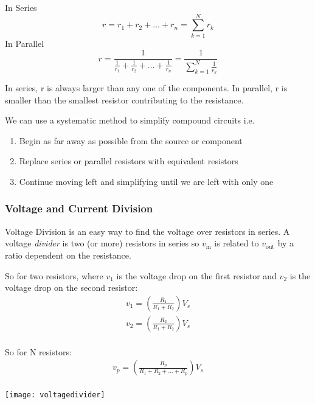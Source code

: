 \documentclass[12pt]{article}
\begin{document}
In Series
\begin{equation*}
  r = r_1 + r_2 + \dots + r_n = \sum^N_{k=1} r_k
\end{equation*}
In Parallel
\begin{equation*}
  r = \frac{1}{\frac{1}{r_1} + \frac{1}{r_2} + \dots + \frac{1}{r_n}} = \frac{1}{\sum^N_{k=1}\frac{1}{r_k}}
\end{equation*}


In series, r is always larger than any one of the components.
In parallel, r is smaller than the smallest resistor contributing to the resistance. 

We can use a systematic method to simplify compound circuits i.e.
\begin{enumerate}
  \item Begin as far away as possible from the source or component
  \item Replace series or parallel resistors with equivalent resistors
  \item Continue moving left and simplifying until we are left with only one
\end{enumerate}

\subsubsection{Voltage and Current Division}
Voltage Division is an easy way to find the voltage over resistors in series.
A voltage \textit{divider} is two (or more) resistors in series so $v_{\text{in}}$ is related to $v_{\text{out}}$ by a ratio dependent on the resistance.

So for two resistors, where $v_1$ is the voltage drop on the first resistor and $v_2$ is the voltage drop on the second resistor:
\begin{align*}
  v_1 = (\frac{R_1}{R_1 + R_2})V_s \\
  v_2 = (\frac{R_2}{R_1 + R_2})V_s \\
\end{align*} 

So for N resistors:
\begin{align*}
  v_p = (\frac{R_p}{R_1 + R_2 + \dots + R_p})V_s \\
\end{align*} 

\begin{marginfigure}
  \vspace{-10cm}

  \texttt{[image: voltagedivider]}
\end{marginfigure}
\end{document}
